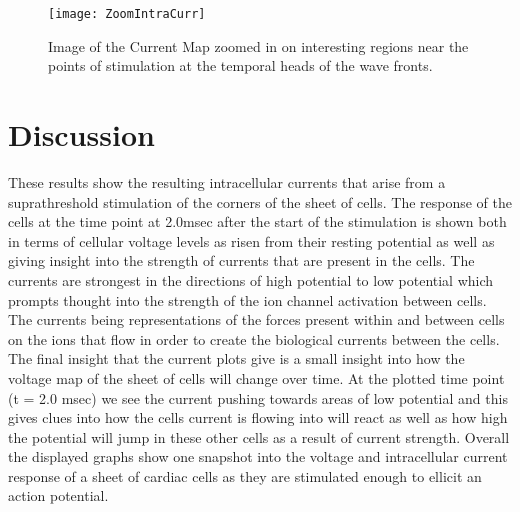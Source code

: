 \documentclass[10pt, titlepage]{article}
\begin{document}
\begin{figure}[htbp!]
\begin{center}
\texttt{[image: ZoomIntraCurr]}
\caption[Zoomed in Intracellular Current Map]{Image of the Current Map zoomed in on interesting regions near the points of stimulation at the temporal heads of the wave fronts.}
\end{center}
\end{figure}

\section{Discussion}
These results show the resulting intracellular currents that arise from a suprathreshold stimulation of the corners of the sheet of cells. The response of the cells at the time point at 2.0msec after the start of the stimulation is shown both in terms of cellular voltage levels as risen from their resting potential as well as giving insight into the strength of currents that are present in the cells. The currents are strongest in the directions of high potential to low potential which prompts thought into the strength of the ion channel activation between cells. The currents being representations of the forces present within and between cells on the ions that flow in order to create the biological currents between the cells.\\

The final insight that the current plots give is a small insight into how the voltage map of the sheet of cells will change over time. At the plotted time point (t = 2.0 msec) we see the current pushing towards areas of low potential and this gives clues into how the cells current is flowing into will react as well as how high the potential will jump in these other cells as a result of current strength. Overall the displayed graphs show one snapshot into the voltage and intracellular current response of a sheet of cardiac cells as they are stimulated enough to ellicit an action potential.


\newpage
\appendix

\end{document}

